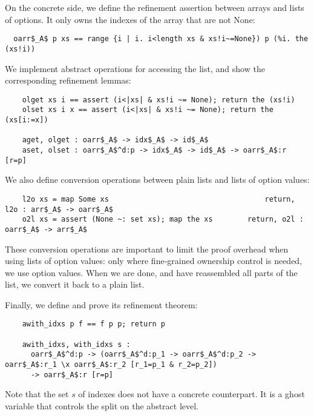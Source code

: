 \documentclass[sn-mathphys,Numbered]{sn-jnl}
\theoremstyle{thmstyleone}%
\theoremstyle{definition}%
\theoremstyle{thmstylethree}%
\begin{document}
  On the concrete side, we define the refinement assertion  between arrays and lists of options.
  It only owns the indexes of the array that are not None:
  \begin{lstlisting}
  oarr$_A$ p xs == range {i | i. i<length xs & xs!i~=None}) p (%i. the (xs!i))
  \end{lstlisting}

  We implement abstract operations for accessing the list, and show the corresponding refinement lemmas:
  \begin{lstlisting}
    olget xs i == assert (i<|xs| & xs!i ~= None); return the (xs!i)
    olset xs i x == assert (i<|xs| & xs!i ~= None); return the (xs[i:=x])

    aget, olget : oarr$_A$ -> idx$_A$ -> id$_A$
    aset, olset : oarr$_A$^d:p -> idx$_A$ -> id$_A$ -> oarr$_A$:r [r=p]
  \end{lstlisting}
  We also define conversion operations between plain lists and lists of option values:
  \begin{lstlisting}
    l2o xs = map Some xs                                    return, l2o : arr$_A$ -> oarr$_A$
    o2l xs = assert (None ~: set xs); map the xs        return, o2l : oarr$_A$ -> arr$_A$
  \end{lstlisting}
  These conversion operations are important to limit the proof overhead when using lists of option
  values: only where fine-grained ownership control is needed, we use option values.
  When we are done, and have reassembled all parts of the list, we convert it back to a plain list.

  Finally, we define  and prove its refinement theorem:
  \begin{lstlisting}
    awith_idxs p f == f p p; return p

    awith_idxs, with_idxs s :
      oarr$_A$^d:p -> (oarr$_A$^d:p_1 -> oarr$_A$^d:p_2 -> oarr$_A$:r_1 \x oarr$_A$:r_2 [r_1=p_1 & r_2=p_2])
      -> oarr$_A$:r [r=p]
  \end{lstlisting}
  Note that the set $s$ of indexes does not have a concrete counterpart.
  It is a ghost variable that controls the split on the abstract level.
\end{document}

